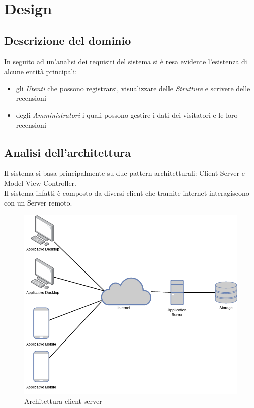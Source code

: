 %
%	 
%

\chapter{Design}
\section{Descrizione del dominio}
In seguito ad un'analisi dei requisiti del sistema si è resa evidente l'esistenza di alcune entità
principali:
\begin{itemize}
    \item gli \textit{Utenti} che possono registrarsi, visualizzare delle \textit{Strutture}
    e scrivere delle recensioni
    \item degli \textit{Amministratori} i quali possono gestire i dati dei visitatori e le loro recensioni
\end{itemize}
\section{Analisi dell'architettura}
Il sistema si basa principalmente su due pattern architetturali: Client-Server e Model-View-Controller.\\
Il sistema infatti è composto da diversi client che tramite internet interagiscono con un Server remoto.
\begin{center}
    \begin{figure}[H]
        \includegraphics[width=\textwidth]{Figures/Architettura client server.png}
        \caption{Architettura client server}
    \end{figure}
\end{center}
